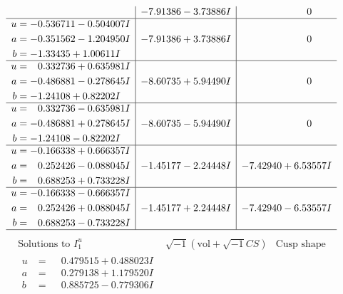 \documentclass[1p]{elsarticle_modified}
\theoremstyle{definition}
\newcommand{\I}{\sqrt{-1}}
\begin{document}
$$\begin{array}{c|c|c}
 & -7.91386 - 3.73886 I & \phantom{-0.000000 } 0 \\ \hline\begin{aligned}
u &= -0.536711 - 0.504007 I \\
a &= -0.351562 - 1.204950 I \\
b &= -1.33435 + 1.00611 I\end{aligned}
 & -7.91386 + 3.73886 I & \phantom{-0.000000 } 0 \\ \hline\begin{aligned}
u &= \phantom{-}0.332736 + 0.635981 I \\
a &= -0.486881 - 0.278645 I \\
b &= -1.24108 + 0.82202 I\end{aligned}
 & -8.60735 + 5.94490 I & \phantom{-0.000000 } 0 \\ \hline\begin{aligned}
u &= \phantom{-}0.332736 - 0.635981 I \\
a &= -0.486881 + 0.278645 I \\
b &= -1.24108 - 0.82202 I\end{aligned}
 & -8.60735 - 5.94490 I & \phantom{-0.000000 } 0 \\ \hline\begin{aligned}
u &= -0.166338 + 0.666357 I \\
a &= \phantom{-}0.252426 - 0.088045 I \\
b &= \phantom{-}0.688253 + 0.733228 I\end{aligned}
 & -1.45177 - 2.24448 I & -7.42940 + 6.53557 I \\ \hline\begin{aligned}
u &= -0.166338 - 0.666357 I \\
a &= \phantom{-}0.252426 + 0.088045 I \\
b &= \phantom{-}0.688253 - 0.733228 I\end{aligned}
 & -1.45177 + 2.24448 I & -7.42940 - 6.53557 I\\
 \hline 
 \end{array}$$\newpage$$\begin{array}{c|c|c}  
\text{Solutions to }I^u_{1}& \I (\text{vol} + \sqrt{-1}CS) & \text{Cusp shape}\\
 \hline 
\begin{aligned}
u &= \phantom{-}0.479515 + 0.488023 I \\
a &= \phantom{-}0.279138 + 1.179520 I \\
b &= \phantom{-}0.885725 - 0.779306 I\end{aligned}

\end{array}$$
\end{document}
